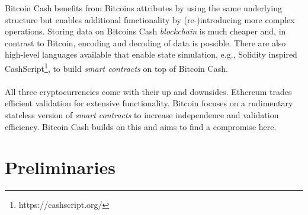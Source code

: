 \documentclass{cacthesis}
\begin{document}
        Bitcoin Cash benefits from Bitcoins attributes by using the same underlying structure but enables additional functionality by (re-)introducing more complex operations. Storing data on Bitcoins Cash \textit{blockchain} is much cheaper and, in contrast to Bitcoin, encoding and decoding of data is possible. There are also high-level languages available that enable state simulation, e.g., Solidity inspired CashScript\footnote{https://cashscript.org/}, to build \textit{smart contracts} on top of Bitcoin Cash. \\\\
        All three cryptocurrencies come with their up and downsides. Ethereum trades efficient validation for extensive functionality. Bitcoin focuses on a rudimentary stateless version of \textit{smart contracts} to increase independence and validation efficiency. Bitcoin Cash builds on this and aims to find a compromise here.
            
            
    \chapter{Preliminaries}
\end{document}
